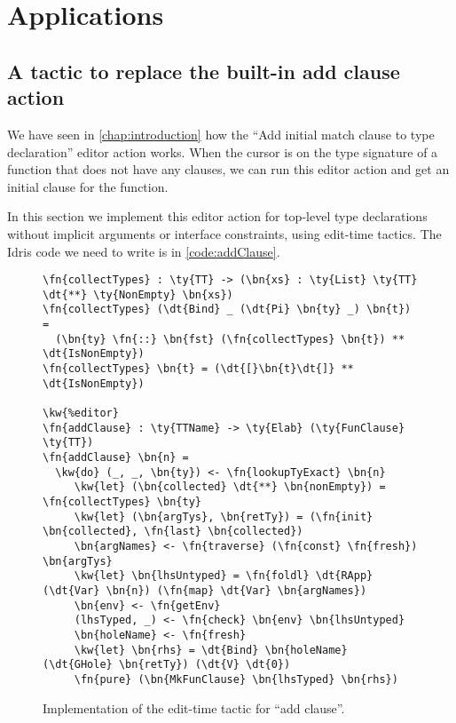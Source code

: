 \chapter{Applications} \label{chap:applications}

\section{A tactic to replace the built-in add clause action}\label{sec:addClause}

We have seen in \autoref{chap:introduction} how the ``Add initial match clause
to type declaration'' editor action works. When the cursor is on the type
signature of a function that does not have any clauses, we can run this editor
action and get an initial clause for the function.

In this section we implement this editor action for top-level type declarations
without implicit arguments or interface constraints, using edit-time tactics.
The Idris code we need to write is in \autoref{code:addClause}.

\begin{figure}[ht]
\caption{Implementation of the edit-time tactic for ``add clause''.}
\label{code:addClause}
\begin{Verbatim}[framesep=2mm, label=\footnotesize{\normalfont{Idris}}, labelposition=topline]
\fn{collectTypes} : \ty{TT} -> (\bn{xs} : \ty{List} \ty{TT} \dt{**} \ty{NonEmpty} \bn{xs})
\fn{collectTypes} (\dt{Bind} _ (\dt{Pi} \bn{ty} _) \bn{t}) =
  (\bn{ty} \fn{::} \bn{fst} (\fn{collectTypes} \bn{t}) ** \dt{IsNonEmpty})
\fn{collectTypes} \bn{t} = (\dt{[}\bn{t}\dt{]} ** \dt{IsNonEmpty})

\kw{%editor}
\fn{addClause} : \ty{TTName} -> \ty{Elab} (\ty{FunClause} \ty{TT})
\fn{addClause} \bn{n} =
  \kw{do} (_, _, \bn{ty}) <- \fn{lookupTyExact} \bn{n}
     \kw{let} (\bn{collected} \dt{**} \bn{nonEmpty}) = \fn{collectTypes} \bn{ty}
     \kw{let} (\bn{argTys}, \bn{retTy}) = (\fn{init} \bn{collected}, \fn{last} \bn{collected})
     \bn{argNames} <- \fn{traverse} (\fn{const} \fn{fresh}) \bn{argTys}
     \kw{let} \bn{lhsUntyped} = \fn{foldl} \dt{RApp} (\dt{Var} \bn{n}) (\fn{map} \dt{Var} \bn{argNames})
     \bn{env} <- \fn{getEnv}
     (lhsTyped, _) <- \fn{check} \bn{env} \bn{lhsUntyped}
     \bn{holeName} <- \fn{fresh}
     \kw{let} \bn{rhs} = \dt{Bind} \bn{holeName} (\dt{GHole} \bn{retTy}) (\dt{V} \dt{0})
     \fn{pure} (\bn{MkFunClause} \bn{lhsTyped} \bn{rhs})
\end{Verbatim}
\end{figure}

